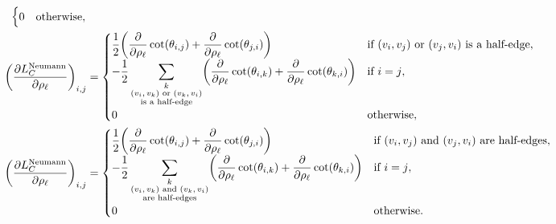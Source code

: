 \begin{align*}
\begin{cases}
		0 & \text{otherwise},
	\end{cases} \\
	\pof{\frac{\partial L_C^{\text{Neumann}}}{\partial \rho_\ell}}_{i, j} &= \begin{cases}
		\displaystyle\frac{1}{2}\pof{\frac{\partial}{\partial \rho_\ell}\cot\pof{\theta_{i, j}} + \frac{\partial}{\partial \rho_\ell}\cot\pof{\theta_{j, i}}} & \text{if \(\pof{v_i, v_j}\) or \(\pof{v_j, v_i}\) is a half-edge}, \\
		\displaystyle-\frac{1}{2}\sum_{\substack{k \\ \text{\(\pof{v_i, v_k}\) or \(\pof{v_k, v_i}\)} \\ \text{is a half-edge}}}\pof{\frac{\partial}{\partial \rho_\ell}\cot\pof{\theta_{i, k}} + \frac{\partial}{\partial \rho_\ell}\cot\pof{\theta_{k, i}}} & \text{if \(i = j\)}, \\
		0 & \text{otherwise},
	\end{cases} \\
	\pof{\frac{\partial L_C^{\text{Neumann}}}{\partial \rho_\ell}}_{i, j} &= \begin{cases}
		\displaystyle\frac{1}{2}\pof{\frac{\partial}{\partial \rho_\ell}\cot\pof{\theta_{i, j}} + \frac{\partial}{\partial \rho_\ell}\cot\pof{\theta_{j, i}}} & \text{if \(\pof{v_i, v_j}\) and \(\pof{v_j, v_i}\) are half-edges}, \\
		\displaystyle-\frac{1}{2}\sum_{\substack{k \\ \text{\(\pof{v_i, v_k}\) and \(\pof{v_k, v_i}\)} \\ \text{are half-edges}}}\pof{\frac{\partial}{\partial \rho_\ell}\cot\pof{\theta_{i, k}} + \frac{\partial}{\partial \rho_\ell}\cot\pof{\theta_{k, i}}} & \text{if \(i = j\)}, \\
		0 & \text{otherwise}.
	\end{cases}
\end{align*}
